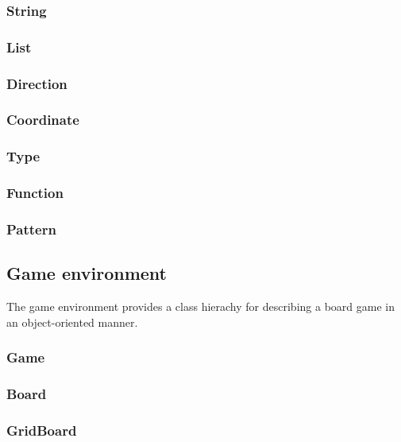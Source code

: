 \subsubsection{String}

\subsubsection{List}

\subsubsection{Direction}

\subsubsection{Coordinate}

\subsubsection{Type}

\subsubsection{Function}

\subsubsection{Pattern}

\subsection{Game environment}

The game environment provides a class hierachy for describing a board game in an object-oriented manner.

\subsubsection{Game}

\subsubsection{Board}

\subsubsection{GridBoard}

